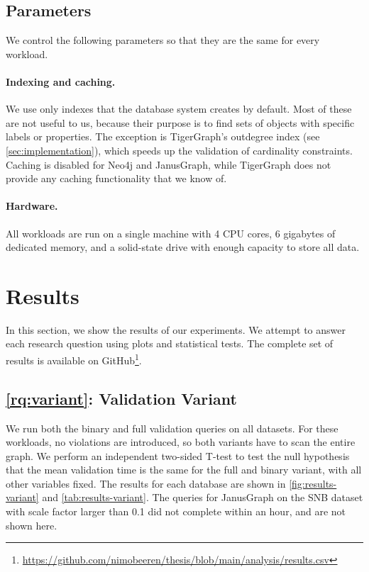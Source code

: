 \documentclass{report}
\theoremstyle{definition}
\begin{document}
\subsection{Parameters}

We control the following parameters so that they are the same for every workload.

\paragraph{Indexing and caching.} We use only indexes that the database system creates by default. Most of these are not useful to us, because their purpose is to find sets of objects with specific labels or properties. The exception is TigerGraph's outdegree index (see \autoref{sec:implementation}), which speeds up the validation of cardinality constraints. Caching is disabled for Neo4j and JanusGraph, while TigerGraph does not provide any caching functionality that we know of.

\paragraph{Hardware.} All workloads are run on a single machine with 4 CPU cores, 6 gigabytes of dedicated memory, and a solid-state drive with enough capacity to store all data.

\section{Results}

In this section, we show the results of our experiments. We attempt to answer each research question using plots and statistical tests. The complete set of results is available on GitHub\footnote{\url{https://github.com/nimobeeren/thesis/blob/main/analysis/results.csv}}.

\subsection{\ref*{rq:variant}: Validation Variant}

We run both the binary and full validation queries on all datasets. For these workloads, no violations are introduced, so both variants have to scan the entire graph. We perform an independent two-sided T-test \citep{student1908probable} to test the null hypothesis that the mean validation time is the same for the full and binary variant, with all other variables fixed. The results for each database are shown in \autoref{fig:results-variant} and \autoref{tab:results-variant}. The queries for JanusGraph on the SNB dataset with scale factor larger than 0.1 did not complete within an hour, and are not shown here.
\end{document}
